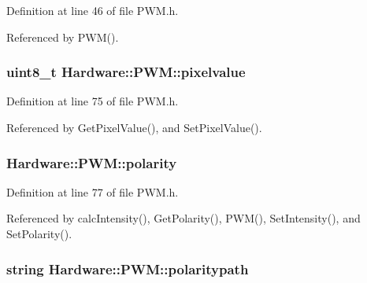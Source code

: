 Definition at line 46 of file P\+W\+M.\+h.



Referenced by P\+W\+M().

\hypertarget{class_hardware_1_1_p_w_m_a27de0bd1068a57a970d21bbbe4fc0872}{}
\subsubsection[{pixelvalue}]{\setlength{\rightskip}{0pt plus 5cm}uint8\+\_\+t Hardware\+::\+P\+W\+M\+::pixelvalue\hspace{0.3cm}{\ttfamily [private]}}\label{class_hardware_1_1_p_w_m_a27de0bd1068a57a970d21bbbe4fc0872}


Definition at line 75 of file P\+W\+M.\+h.



Referenced by Get\+Pixel\+Value(), and Set\+Pixel\+Value().

\hypertarget{class_hardware_1_1_p_w_m_ad346586d086f8462c3de6a4c19edb1d3}{}
\subsubsection[{polarity}]{ Hardware\+::\+P\+W\+M\+::polarity\hspace{0.3cm}{\ttfamily [private]}}\label{class_hardware_1_1_p_w_m_ad346586d086f8462c3de6a4c19edb1d3}


Definition at line 77 of file P\+W\+M.\+h.



Referenced by calc\+Intensity(), Get\+Polarity(), P\+W\+M(), Set\+Intensity(), and Set\+Polarity().

\hypertarget{class_hardware_1_1_p_w_m_ace89c96484ffa9d6c9f3a8067848bf51}{}
\subsubsection[{polaritypath}]{\setlength{\rightskip}{0pt plus 5cm}string Hardware\+::\+P\+W\+M\+::polaritypath\hspace{0.3cm}{\ttfamily [private]}}\label{class_hardware_1_1_p_w_m_ace89c96484ffa9d6c9f3a8067848bf51}


